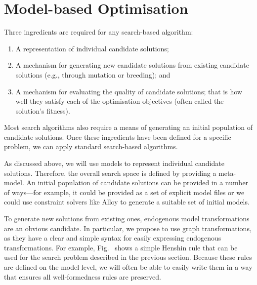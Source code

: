 \section{Model-based Optimisation}
\label{section:mde_optimisation}


	Three ingredients are required for any search-based algorithm: 
	\begin{enumerate}
		\item A representation of individual candidate solutions;
		\item A mechanism for generating new candidate solutions from existing candidate solutions (e.g., through mutation or breeding); and
		\item A mechanism for evaluating the quality of candidate solutions; that is how well they satisfy each of the optimisation objectives (often called the solution's fitness).
	\end{enumerate}
	Most search algorithms also require a means of generating an initial population of candidate solutions. Once these ingredients have been defined for a specific problem, we can apply standard 
	search-based algorithms.
	
	As discussed above, we will use models to represent individual candidate solutions. Therefore, the overall search space is defined by providing a meta-model. An initial population of candidate
	solutions can be provided in a number of ways---for example, it could be provided as a set of explicit model files or we could use constraint solvers like Alloy \cite{generating_models} to generate
	a suitable set of initial models.
	
	To generate new solutions from existing ones, endogenous model transformations are an obvious candidate. In particular, we propose to use graph transformations, as they have a clear and simple
	syntax for easily expressing endogenous transformations. For example, Fig.~ shows a simple Henshin rule that can be used for the search problem described in the previous section.
	Because these rules are defined on the model level, we will often be able to easily write them in a way that ensures all well-formedness rules are preserved.
	
